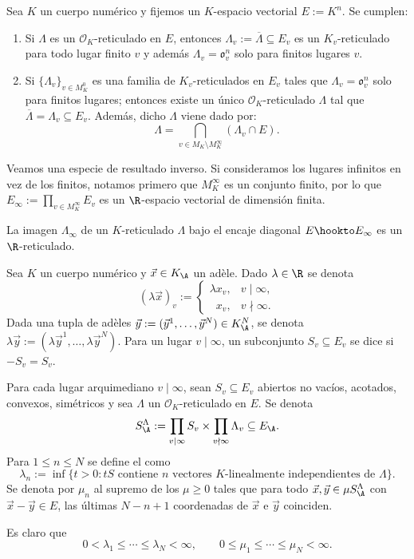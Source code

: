 \documentclass[teoria-numeros.tex]{subfiles}
\begin{document}
\begin{prop}
	Sea $K$ un cuerpo numérico y fijemos un $K$-espacio vectorial $E := K^n$.
	Se cumplen:
	\begin{enumerate}
		\item Si $\Lambda$ es un $\mathcal{O}_K$-reticulado en $E$,
			entonces $\Lambda_v := \overline{\Lambda} \subseteq E_v$ es un $K_v$-reticulado para todo lugar finito $v$ y
			además $\Lambda_v = \mathfrak{o}_v^n$ solo para finitos lugares $v$.
		\item Si $\{ \Lambda_v \}_{v\in M_K^0}$ es una familia de $K_v$-reticulados en $E_v$ tales que $\Lambda_v = \mathfrak{o}_v^n$
			solo para finitos lugares; entonces existe un único $\mathcal{O}_K$-reticulado $\Lambda$ tal que
			$\overline{\Lambda} = \Lambda_v \subseteq E_v$.
			Además, dicho $\Lambda$ viene dado por:
			$$ \Lambda = \bigcap_{v\in M_K \setminus M_K^\infty} (\Lambda_v \cap E). $$
	\end{enumerate}
\end{prop}

Veamos una especie de resultado inverso.
Si consideramos los lugares infinitos en vez de los finitos, notamos primero que $M_K^\infty$ es un conjunto finito,
por lo que $E_\infty := \prod_{v\in M_K^\infty} E_v$ es un $\R$-espacio vectorial de dimensión finita.
\begin{prop}
	La imagen $\Lambda_\infty$ de un $K$-reticulado $\Lambda$ bajo el encaje diagonal $E \hookto E_\infty$ es un $\R$-reticulado.
\end{prop}

\begin{mydef}
	Sea $K$ un cuerpo numérico y $\vec x \in K_\A$ un adèle.
	Dado $\lambda \in \R$ se denota
	\[
		(\lambda\vec x)_v :=
		\begin{cases}
			\lambda x_v, & v\mid\infty, \\
			\phantom{\lambda}x_v, & v\nmid\infty.
		\end{cases}
	\]
	Dada una tupla de adèles $\vec y := ({\vec y}^1, \dots, {\vec y}^N) \in K_\A^N$, se denota $\lambda\vec y := (\lambda{\vec y}^1, \dots, \lambda{\vec y}^N)$.
	Para un lugar $v \mid \infty$, un subconjunto $S_v \subseteq E_v$ se dice  si $-S_v = S_v$.

	Para cada lugar arquimediano $v \mid \infty$, sean $S_v \subseteq E_v$ abiertos no vacíos, acotados, convexos, simétricos y
	sea $\Lambda$ un $\mathcal{O}_K$-reticulado en $E$.
	Se denota
	$$ S_\A^\Lambda := \prod_{v \mid \infty} S_v \times \prod_{v \nmid \infty} \Lambda_v \subseteq E_\A. $$
	Para $1 \le n \le N$ se define el  como
	$$ \lambda_n := \inf\{ t > 0 : tS \text{ contiene $n$ vectores $K$-linealmente independientes de } \Lambda \}. $$
	Se denota por $\mu_n$ al supremo de los $\mu \ge 0$ tales que para todo $\vec x, \vec y \in \mu S_\A^\Lambda$ con $\vec x - \vec y \in E$,
	las últimas $N - n + 1$ coordenadas de $\vec x$ e $\vec y$ coinciden.
\end{mydef}
Es claro que
$$ 0 < \lambda_1 \le \cdots \le \lambda_N < \infty, \qquad 0 \le \mu_1 \le \cdots \le \mu_N < \infty. $$
\end{document}

